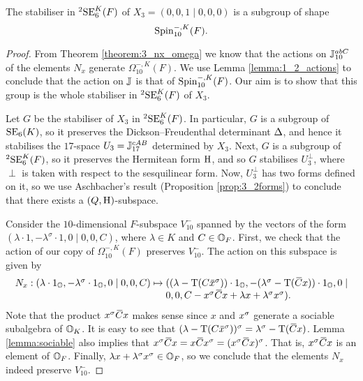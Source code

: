 \begin{theorem}
	\label{theorem:2_type3_stabiliser}
	The stabiliser in ${}^2\mathrm{SE}_6^K(F)$ of $X_3 = (0,0,1\mid 0,0,0)$ 
	is a subgroup of shape
	\begin{equation}
		\mathrm{Spin}_{10}^{-,K}(F).
	\end{equation}
\end{theorem}

\begin{proof}
	From Theorem \ref{theorem:3_nx_omega} we know that the actions on $\mathbb{J}_{10}^{abC}$
	of the elements $N_x$ generate $\Omega_{10}^{-,K}(F)$. We use 
	Lemma \ref{lemma:1_2_actions} to conclude that the action on $\mathbb{J}$ is that of
	$\mathrm{Spin}_{10}^{-,K}(F)$. Our aim is to show that this group is the whole stabiliser
	in ${}^2\mathrm{SE}_6^K(F)$ of $X_3$.
	
	Let $G$ be the stabiliser of $X_3$ in ${}^2\mathrm{SE}_6^K(F)$. In particular, $G$ is 
	a subgroup of $\mathrm{SE}_6(K)$, so it preserves the Dickson--Freudenthal determinant
	$\Delta$, and hence it stabilises the $17$-space $U_3 = \mathbb{J}_{17}^{cAB}$ 
	determined by $X_3$. Next, $G$
	is a subgroup of ${}^2\mathrm{SE}_6^K(F)$, so it preserves the Hermitean form $\mathrm{H}$,
	and so $G$ stabilises $U_3^{\perp}$, where $\perp$ is taken with respect to the
	sesquilinear form. 
	Now, $U_3^{\perp}$ has two forms defined on it, so we use Aschbacher's result 
	(Proposition \ref{prop:3_2forms}) to conclude that there exists a $(Q, \mathrm{H})$-subspace.	
	
	Consider the $10$-dimensional $F$-subspace $V_{10}^-$ spanned by the vectors 
	of the form $(\lambda\cdot 1, -\lambda^{\sigma}\cdot 1, 
	0 \mid 0,0,C)$, where $\lambda \in K$ and 
	$C \in \mathbb{O}_F$. First, we check that the action of our copy of $\Omega_{10}^{-,K}(F)$ 
	preserves $V_{10}^-$. The action on this subspace is given by
	\begin{equation*}
		\begin{array}{r@{\;}c@{\;}l}
			N_x: (\lambda\cdot 1_{\O}, -\lambda^{\sigma} \cdot 1_{\O}, 0 \mid 0,0, C) & \mapsto & 
				((\lambda - \Tr(C \ovx^{\s}))\cdot 1_{\O}, 
				-(\lambda^{\sigma} -\Tr(\ovC x))\cdot 1_{\O}, 
				0 \mid \\
		& &					0,0, C - x^{\s} \ovC x + \lambda x + \lambda^{\sigma} x^{\s}).
		\end{array}
	\end{equation*}
	Note that the product $x^{\sigma} \mathord{\mbox{\hspace*{0pt}}\,\overline{\!C\!\!\;}\!\:}\mbox{\hspace*{0pt}} x$ makes sense since $x$ and $x^{\sigma}$ generate a
	sociable subalgebra of $\mathbb{O}_K$. It is easy to see that 
	$(\lambda - \Tr(C\ovx^{\s}))^{\sigma} = 
	\lambda^{\sigma} - \Tr(\ovC x)$. Lemma \ref{lemma:sociable} also implies that 
	$x^{\s} \ovC x = x \ovC x^{\s} = (x^{\s} \ovC x)^{\s}$. That is, $x^{\sigma} \mathord{\mbox{\hspace*{0pt}}\,\overline{\!C\!\!\;}\!\:}\mbox{\hspace*{0pt}} x$ is an 
    element of $\mathbb{O}_F$. Finally, $\lambda x +  \lambda^{\sigma} x^{\sigma} \in \mathbb{O}_F$, 
    so we conclude that 
    the elements $N_x$ indeed preserve $V_{10}^{-}$.
    

\end{proof}
